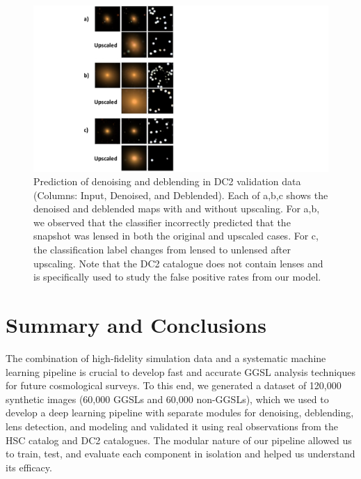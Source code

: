 \documentclass[12pt, twocolumn, apj]{openjournal}
\begin{document}
\begin{figure}[!tp]
\centering
\includegraphics[width=\linewidth]{Figures/DC2_newmask_V2.pdf}
\caption{Prediction of denoising and deblending in DC2 validation data (Columns: Input, Denoised, and Deblended). Each of a,b,c shows the denoised and deblended maps with and without upscaling. For a,b, we observed that the classifier incorrectly predicted that the snapshot was lensed in both the original and upscaled cases. For c, the classification label changes from lensed to unlensed after upscaling. Note that the DC2 catalogue does not contain lenses and is specifically used to study the false positive rates from our model. }
\label{Fig:DC2_Process_ambiguous} 
\end{figure}

\section{Summary and Conclusions}
The combination of high-fidelity simulation data and a systematic machine learning pipeline is crucial to develop fast and accurate GGSL analysis techniques for future cosmological surveys. To this end, we generated a dataset of 120,000 synthetic images (60,000  GGSLs and 60,000 non-GGSLs), which we used to develop a deep learning pipeline with separate modules for denoising, deblending, lens detection, and modeling and validated it using real observations from the HSC catalog and DC2 catalogues. 
The modular nature of our pipeline allowed us to train, test, and evaluate each component in isolation and helped us understand its efficacy. 
\end{document}
